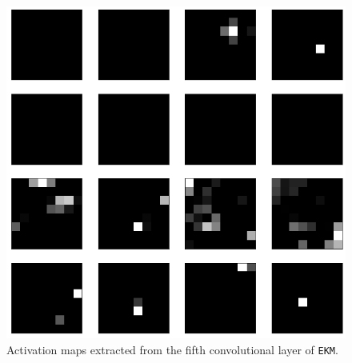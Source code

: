 \documentclass[aps,twocolumn,secnumarabic,nobalancelastpage,amsmath,amssymb,
nofootinbib]{revtex4}
\begin{document}
\begin{figure}[h!]
	\centering
	\includegraphics[width=0.65\linewidth]{Images/FeatureMaps8}
	
	\caption{Activation maps extracted from the fifth convolutional layer of \texttt{EKM}.}
	\label{fig:fm2}
\end{figure}

\pagebreak

\nocite{*}

\end{document}
